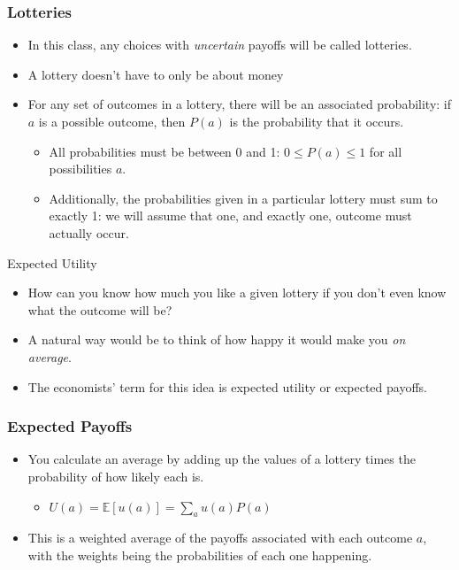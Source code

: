 \begin{frame}
\frametitle{Lotteries}
\begin{itemize}
  \item In this class, any choices with \textit{uncertain} payoffs will be called \alert{lotteries}.
	\item A lottery doesn't have to only be about money
  \item For any set of outcomes in a lottery, there will be an associated probability: if $a$ is a possible outcome, then $P(a)$ is the probability that it occurs.
	\begin{itemize}
		\item All probabilities must be between 0 and 1: $0 \leq P(a) \leq 1$ for all possibilities $a$.
		\item Additionally, the probabilities given in a particular lottery must sum to exactly 1: we will assume that one, and exactly one, outcome must actually occur.
	\end{itemize}
\end{itemize}
\end{frame}


\begin{frame}{Expected Utility}
  \begin{itemize}
    \item How can you know how much you like a given lottery
    if you don't even know what the outcome will be?

    \item A natural way would be to think of how happy it would make you \textit{on average}.

    \item The economists' term for this idea is 
    \alert{expected utility} or \alert{expected payoffs}.

  \end{itemize}
\end{frame}


\begin{frame}
\frametitle{Expected Payoffs}
\begin{itemize}
  \item You calculate an average by adding up the values of a lottery times the probability of how likely each is.
	\begin{itemize}
    \item $U(a) = \mathbb{E}[u(a)] = \sum_{a}u(a)P(a)$
	\end{itemize}
	\item This is a weighted average of the payoffs associated with each outcome $a$, with the weights being the probabilities of each one happening.
\end{itemize}
\end{frame}

